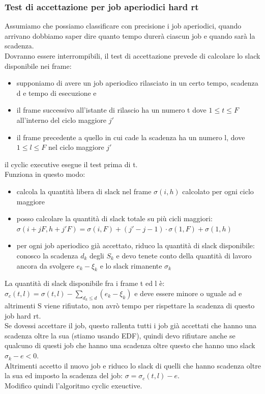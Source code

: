 \documentclass[12pt, oneside]{extbook}
\begin{document}
\subsubsection{Test di accettazione per job aperiodici hard rt}
Assumiamo che possiamo classificare con precisione i job aperiodici, quando arrivano dobbiamo saper dire quanto tempo durerà ciascun job e quando sarà la scadenza.\\
Dovranno essere interrompibili, il test di accettazione prevede di calcolare lo slack disponibile nei frame:
\begin{itemize}
	\item supponiamo di avere un job aperiodico rilasciato in un certo tempo, scadenza d e tempo di esecuzione e
	\item il frame successivo all'istante di rilascio ha un numero t dove $1 \leq t \leq F$ all'interno del ciclo maggiore $j'$
	\item il frame precedente a quello in cui cade la scadenza ha un numero l, dove $1 \leq l \leq F$ nel ciclo maggiore $j'$
\end{itemize}
il cyclic executive esegue il test prima di t.\\
Funziona in questo modo:
\begin{itemize}
	\item calcola la quantità libera di slack nel frame $\sigma(i, h)$ calcolato per ogni ciclo maggiore 
	\item posso calcolare la quantità di slack totale su più cicli maggiori:\\$\sigma(i+jF, h +j'F) = \sigma(i, F) + (j'-j-1) \cdot \sigma(1,F) + \sigma(1,h)$
	\item per ogni job aperiodico già accettato, riduco la quantità di slack disponibile: conosco la scadenza $d_k$ degli $S_k$ e devo tenete conto della quantità di lavoro ancora da svolgere $e_k - \xi_k$ e lo slack rimanente $\sigma_k$
\end{itemize}
La quantità di slack disponibile fra i frame t ed l è:\\
$\sigma_c(t,l) = \sigma(t,l) - \sum_{d_k \leq d} (e_k - \xi_k)$ e deve essere minore o uguale ad e altrimenti S viene rifiutato, non avrò tempo per rispettare la scadenza di questo job hard rt.\\
Se dovessi accettare il job, questo rallenta tutti i job già accettati che hanno una scadenza oltre la sua (stiamo usando EDF), quindi devo rifiutare anche se qualcuno di questi job che hanno una scadenza oltre questo che hanno uno slack $\sigma_k - e < 0$.\\
Altrimenti accetto il nuovo job e riduco lo slack di quelli che hanno scadenza oltre la sua ed imposto la scadenza del job: $\sigma = \sigma_c(t, l) - e$.\\
Modifico quindi l'algoritmo cyclic exeuctive.
\end{document}
